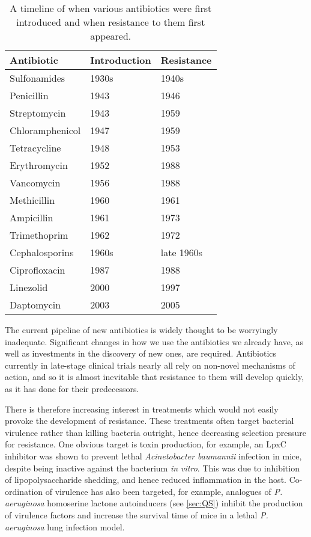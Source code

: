 \begin{table}[H]
  \centering
\begin{tabular}{|p{}|p{}|p{}|}
\hline  
\textbf{Antibiotic} & \textbf{Introduction} & \textbf{Resistance} \\ 
\hline
Sulfonamides & 1930s & 1940s \\ 
\hline 
Penicillin & 1943 & 1946 \\ 
\hline 
Streptomycin & 1943 & 1959 \\ 
\hline 
Chloramphenicol & 1947 & 1959 \\ 
\hline 
Tetracycline & 1948 & 1953 \\ 
\hline 
Erythromycin & 1952 & 1988 \\ 
\hline 
Vancomycin & 1956 & 1988 \\ 
\hline 
Methicillin & 1960 & 1961 \\ 
\hline 
Ampicillin & 1961 & 1973 \\ 
\hline 
Trimethoprim & 1962 & 1972 \\
\hline 
Cephalosporins & 1960s & late 1960s \\
\hline 
Ciprofloxacin & 1987 & 1988 \\
\hline 
Linezolid & 2000 & 1997 \\
\hline
Daptomycin & 2003 & 2005\\
\hline
\end{tabular}
\caption{A timeline of when various antibiotics were first introduced and when resistance to them first appeared\cite{Clatworthy2007,Palumbi2001,Ogle1988,Huovinen2001,Birmingham2003,Lee2007}.\label{tbl:AB_timeline}} 
\end{table}

The current pipeline of new antibiotics is widely thought to be worryingly inadequate\cite{Boucher2009,WHO,WEF}. Significant changes in how we use the antibiotics we already have, as well as investments in the discovery of new ones, are required.
Antibiotics currently in late-stage clinical trials nearly all rely on non-novel mechanisms of action\cite{Boucher2009}, and so it is almost inevitable that resistance to them will develop quickly, as it has done for their predecessors.

There is therefore increasing interest in treatments which would not easily provoke the development of resistance\cite{Spellberg2013}. These treatments often target bacterial virulence rather than killing bacteria outright, hence decreasing selection pressure for resistance\cite{Clatworthy2007}. 
One obvious target is toxin production, for example, an LpxC inhibitor was shown to prevent lethal \textit{Acinetobacter baumannii} infection in mice, despite being inactive against the bacterium \textit{in vitro}\cite{Lin2012}. This was due to inhibition of lipopolysaccharide shedding, and hence reduced inflammation in the host.
Co-ordination of virulence has also been targeted, for example, analogues of \textit{P. aeruginosa} homoserine lactone autoinducers (see \ref{sec:QS}) inhibit the production of virulence factors and increase the survival time of mice in a lethal \textit{P. aeruginosa} lung infection model\cite{Clatworthy2007}.

